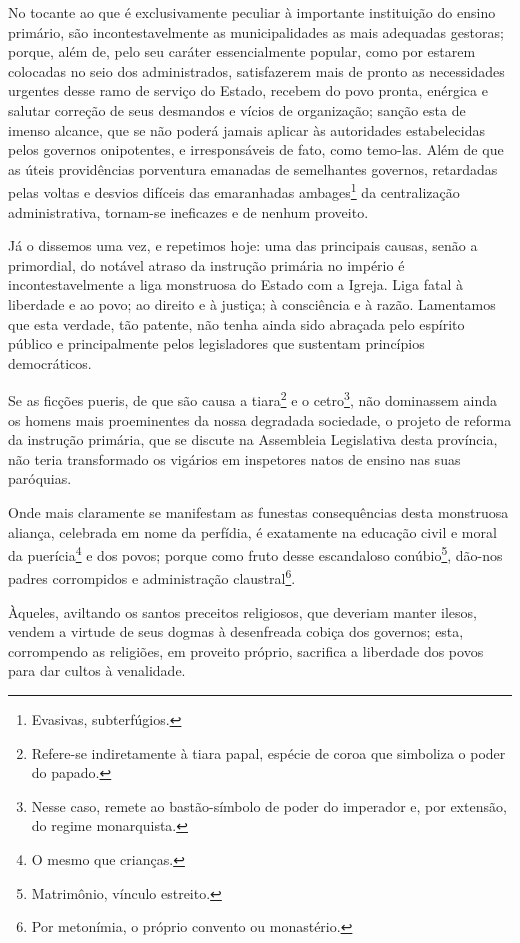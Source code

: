 No tocante ao que é exclusivamente peculiar à importante instituição do
ensino primário, são incontestavelmente as municipalidades as mais
adequadas gestoras; porque, além de, pelo seu caráter essencialmente
popular, como por estarem colocadas no seio dos administrados,
satisfazerem mais de pronto as necessidades urgentes desse ramo de
serviço do Estado, recebem do povo pronta, enérgica e salutar correção
de seus desmandos e vícios de organização; sanção esta de imenso
alcance, que se não poderá jamais aplicar às autoridades estabelecidas
pelos governos onipotentes, e irresponsáveis de fato, como temo-las.
Além de que as úteis providências porventura emanadas de semelhantes
governos, retardadas pelas voltas e desvios difíceis das emaranhadas
ambages\footnote{Evasivas, subterfúgios.} da centralização
administrativa, tornam-se ineficazes e de nenhum proveito.

Já o dissemos uma vez, e repetimos hoje: uma das principais causas,
senão a primordial, do notável atraso da instrução primária no império é
incontestavelmente a liga monstruosa do Estado com a Igreja. Liga fatal
à liberdade e ao povo; ao direito e à justiça; à consciência e à razão.
Lamentamos que esta verdade, tão patente, não tenha ainda sido abraçada
pelo espírito público e principalmente pelos legisladores que sustentam
princípios democráticos.

Se as ficções pueris, de que são causa a tiara\footnote{Refere-se
  indiretamente à tiara papal, espécie de coroa que simboliza o poder do
  papado.} e o cetro\footnote{Nesse caso, remete ao bastão-símbolo de
  poder do imperador e, por extensão, do regime monarquista.}, não
dominassem ainda os homens mais proeminentes da nossa degradada
sociedade, o projeto de reforma da instrução primária, que se discute na
Assembleia Legislativa desta província, não teria transformado os
vigários em inspetores natos de ensino nas suas paróquias.

Onde mais claramente se manifestam as funestas consequências desta
monstruosa aliança, celebrada em nome da perfídia, é exatamente na
educação civil e moral da puerícia\footnote{O mesmo que crianças.} e
dos povos; porque como fruto desse escandaloso conúbio\footnote{
  Matrimônio, vínculo estreito.}, dão-nos padres corrompidos e
administração claustral\footnote{Por metonímia, o próprio convento ou
  monastério.}.

Àqueles, aviltando os santos preceitos religiosos, que deveriam manter
ilesos, vendem a virtude de seus dogmas à desenfreada cobiça dos
governos; esta, corrompendo as religiões, em proveito próprio, sacrifica
a liberdade dos povos para dar cultos à venalidade.

